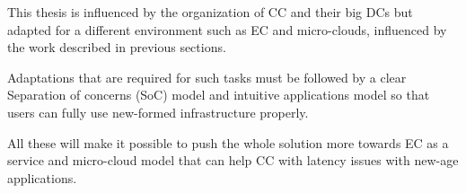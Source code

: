 This thesis is influenced by the organization of CC and their big DCs but adapted for a different environment such as EC and micro-clouds, influenced by the work described in previous sections. 

Adaptations that are required for such tasks must be followed by a clear Separation of concerns (SoC) model and intuitive applications model so that users can fully use new-formed infrastructure properly. 

All these will make it possible to push the whole solution more towards EC as a service and micro-cloud model that can help CC with latency issues with new-age applications.
%
%